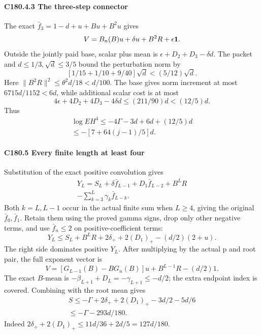 \paragraph{C180.4.3 The three-step connector}

The exact \(\bar f_3=1-d+u+Bu+B^2u\) gives
\[
 V=B_n(B)u+\delta u+B^2R+\epsilon\mathbf1.
\]
Outside the jointly paid base, scalar plus mean is \(\epsilon+D_2+D_3-\delta d\). The packet and \(d\le1/3,\allowbreak \allowbreak  \sqrt d\le3/5\) bound the perturbation norm by
\[
 [1/15+1/10+9/40]\sqrt d<(5/12)\sqrt d.
\]
Here \(\|B^2R\|^2\le\theta^2d/18<d/100\). The base gives norm increment at most \(6715d/1152<6d\), while additional scalar cost is at most
\[
 4\epsilon+4D_2+4D_3-4\delta d\le(211/90)d<(12/5)d.
\]
Thus
\[
\begin{gathered}
\log EH^4\le-4\Gamma-3d+6d+(12/5)d\\
\le-[7+64(j-1)/5]d.
\end{gathered}\tag{C180.30}
\]

\paragraph{C180.5 Every finite length at least four}

Substitution of the exact positive convolution gives
\[
\begin{gathered}
Y_L=S_L+\delta \bar f_{L-1}+D_1\bar f_{L-2}+B^LR\\
-\sum_{k=3}^L\gamma_k \bar f_{L-k}.
\end{gathered}\tag{C180.31}
\]
Both \(k=L,\allowbreak \allowbreak  L-1\) occur in the actual finite sum when \(L\ge4\), giving the original \(\bar f_0,\allowbreak \allowbreak  \bar f_1\). Retain them using the proved gamma signs, drop only other negative terms, and use \(\bar f_n\le2\) on positive-coefficient terms:
\[
 Y_L\le S_L+B^LR+2\delta_++2(D_1)_+-(d/2)(2+u).
\]
The right side dominates positive \(Y_L.\) After multiplying by the actual p and root pair, the full exponent vector is
\[
 V=[G_{L-1}(B)-BG_n(B)]u+B^{L-1}R-(d/2)1.             \tag{C180.32}
\]
The exact \(B\)-mean is \(-\beta_{L+1}+D_L=-\gamma_{L+1}\le-d/2\); the extra endpoint index is covered. Combining with the root mean gives
\[
\begin{gathered}
S\le-\Gamma+2\delta_++2(D_1)_+-3d/2-5d/6\\
\le-\Gamma-293d/180.
\end{gathered}\tag{C180.33}
\]
Indeed \(2\delta_++2(D_1)_+\le11d/36+2d/5=127d/180\).

